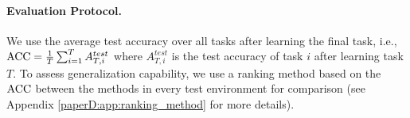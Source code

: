 \vspace{-3mm}
\paragraph{Evaluation Protocol.} We use the average test accuracy over all tasks after learning the final task, i.e., ${\text{ACC}} = \frac{1}{T} \sum_{i=1}^{T} A_{T, i}^{test}$ where $A_{T, i}^{test}$ is the test accuracy of task $i$ after learning task $T$. 
To assess generalization capability, we use a ranking method based on the ${\text{ACC}}$ between the methods in every test environment for comparison (see Appendix \ref{paperD:app:ranking_method} for more details). 


\begin{comment}
\begin{table}[t]
	\footnotesize%
	\centering
	\caption{Average ranking (lower is better) for experiments on generalizing policies to environments with new task orders or a new dataset. %
		We average the results over 10 test environments. %
	}
	\label{tab:average_ranking_rl_experiment}
		\begin{tabular}{l c c c c c}
			\toprule %
			& \multicolumn{3}{c}{ {\bf New Task Order}} & \multicolumn{2}{c}{ {\bf New Dataset}}\\
			\cmidrule(lr){2-4}  \cmidrule(lr){5-6}
			{\bf Method} & S-MNIST & S-FashionMNIST & S-CIFAR-10 & S-notMNIST & S-FashionMNIST  \\ 
			\midrule
			Random         & 4.23   & 3.60 & 5.03 & 3.87 & 3.95\\ 
			ETS            & 3.80 & 4.57 & 5.37 & 4.27 & 3.63 \\
			\midrule 
			Heur-GD        & 4.48 & 4.25 & 3.98 & 4.58 & {\bf 2.77} \\
			Heur-LD        & 4.65 & 3.65 & 3.75 & 4.97 & 5.10 \\
			Heur-AT        & 4.33 & 3.87 & 3.43 & 4.28 & 3.72 \\
			\midrule
			DQN (Ours)     & {\bf 3.23} & {\bf 3.55} & 3.68 & 3.20 & 4.37 \\
			A2C (Ours)     & 3.27 & 4.52 & {\bf 2.75} & {\bf 2.83} & 4.47 \\
			\bottomrule %
		\end{tabular}
	\vspace{-2mm}
\end{table}
\end{comment}


